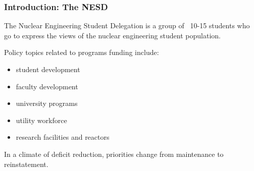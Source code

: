 \begin{frame}[ctb!]
  \frametitle{Introduction: The NESD}
  The Nuclear Engineering Student Delegation is a group of ~10-15 students
  who go to express the views of the nuclear engineering student population.
  \vspace{0.4cm}
  \pause

  Policy topics related to programs funding include:
  \begin{itemize}
    \item student development
    \item faculty development
    \item university programs
    \item utility workforce
    \item research facilities and reactors
  \end{itemize}
  \vspace{0.3cm}
  \pause

  In a climate of deficit reduction, priorities change from maintenance to reinstatement.
\end{frame}

